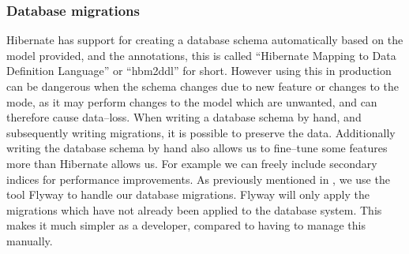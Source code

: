 \subsubsection*{Database migrations}
Hibernate has support for creating a database schema automatically based on the model provided, and the annotations,
this is called ``Hibernate Mapping to Data Definition Language'' or ``hbm2ddl'' for short.
However using this in production can be dangerous when the schema changes due to new feature or changes to the mode,
as it may perform changes to the model which are unwanted,
and can therefore cause data--loss\cite[p.~64]{javapersistence}.
When writing a database schema by hand, and subsequently writing migrations, it is possible to preserve the data.
Additionally writing the database schema by hand also allows us to fine--tune some features more than Hibernate allows us.
For example we can freely include secondary indices for performance improvements.
As previously mentioned in , we use the tool Flyway to handle our database migrations.
Flyway will only apply the migrations which have not already been applied to the database system.
This makes it much simpler as a developer, compared to having to manage this manually.

